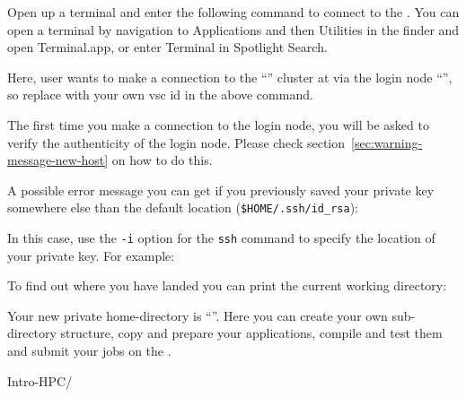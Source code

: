   Open up a terminal and enter the following command to connect to the \hpc.
  \ifmac
  You can open a terminal by navigation to Applications and then Utilities in the finder and open Terminal.app, or enter Terminal in Spotlight Search.
  \fi

\begin{prompt}
\end{prompt}

  Here, user \userid wants to make a connection to the ``\hpcname'' cluster at
  \university via the login node ``\loginnode'', so replace \userid with your own
  vsc id in the above command.

  The first time you make a connection to the login node, you will be asked to
  verify the authenticity of the login node. Please check section~\ref{sec:warning-message-new-host}
  on how to do this.

A possible error message you can get if you previously saved your private key
somewhere else than the default location (\verb|$HOME/.ssh/id_rsa|):

\begin{prompt}
\end{prompt}

In this case, use the \verb|-i| option for the \verb|ssh| command to specify the location
of your private key. For example:

\begin{prompt}
\end{prompt}

\fi

To find out where you have landed you can print the current working directory:

\begin{prompt}
\end{prompt}


Your new private home-directory is ``\homedir''.
Here you can create your own sub-directory structure, copy and prepare your
applications, compile and test them and submit your jobs on the \hpc.

\begin{prompt}
Intro-HPC/
\end{prompt}

